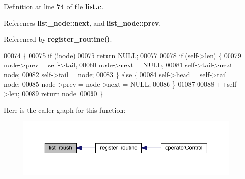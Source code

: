 Definition at line \textbf{ 74} of file \textbf{ list.\+c}.



References \textbf{ list\+\_\+node\+::next}, and \textbf{ list\+\_\+node\+::prev}.



Referenced by \textbf{ register\+\_\+routine()}.


\begin{DoxyCode}
00074                                                          \{
00075   \textcolor{keywordflow}{if} (!node)
00076     \textcolor{keywordflow}{return} NULL;
00077 
00078   \textcolor{keywordflow}{if} (self->len) \{
00079     node->prev = \textcolor{keyword}{self}->tail;
00080     node->next = NULL;
00081     \textcolor{keyword}{self}->tail->next = node;
00082     \textcolor{keyword}{self}->tail = node;
00083   \} \textcolor{keywordflow}{else} \{
00084     \textcolor{keyword}{self}->head = \textcolor{keyword}{self}->tail = node;
00085     node->prev = node->next = NULL;
00086   \}
00087 
00088   ++\textcolor{keyword}{self}->len;
00089   \textcolor{keywordflow}{return} node;
00090 \}
\end{DoxyCode}
Here is the caller graph for this function\+:\nopagebreak
\begin{figure}[H]
\begin{center}
\leavevmode
\includegraphics[width=350pt]{list_8c_a4edfa9b7742154bff4fc2cb05d044af9_icgraph}
\end{center}
\end{figure}
